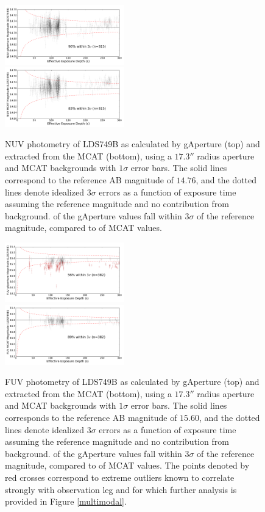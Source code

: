 \documentclass[trackchanges,preprint2]{aastex}
\begin{document}
\begin{figure}[h!]
\includegraphics[width=0.46\textwidth,keepaspectratio]{Fig06a.pdf}\\
\includegraphics[width=0.46\textwidth,keepaspectratio]{Fig06b.pdf}
\caption{NUV photometry of LDS749B as calculated by gAperture (top) and extracted from the MCAT (bottom), using a $17.3''$ radius aperture and MCAT backgrounds with $1\sigma$ error bars. The solid lines correspond to the reference AB magnitude of $14.76$, and the dotted lines denote idealized $3\sigma$ errors as a function of exposure time assuming the reference magnitude and no contribution from background.  of the gAperture values fall within $3\sigma$ of the reference magnitude, compared to  of MCAT values.
\label{ldsabsphotnuv}}
\end{figure}

\begin{figure}[h!]
\includegraphics[width=0.46\textwidth,keepaspectratio]{Fig07a.pdf}\\
\includegraphics[width=0.46\textwidth,keepaspectratio]{Fig07b.pdf}
\caption{FUV photometry of LDS749B as calculated by gAperture (top) and extracted from the MCAT (bottom), using a $17.3''$ radius aperture and MCAT backgrounds with $1\sigma$ error bars. The solid lines corresponds to the reference AB magnitude of $15.60$, and the dotted lines denote idealized $3\sigma$ errors as a function of exposure time assuming the reference magnitude and no contribution from background.  of the gAperture values fall within $3\sigma$ of the reference magnitude, compared to  of MCAT values. The points denoted by red crosses correspond to extreme outliers known to correlate strongly with observation leg and for which further analysis is provided in Figure \ref{multimodal}.
\label{ldsabsphotfuv}}
\end{figure}
\end{document}
